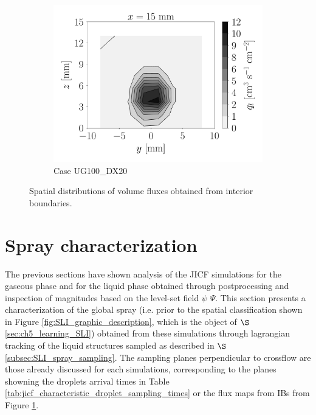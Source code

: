 \begin{figure}[ht]
\begin{subfigure}[b]{1.1\textwidth}
   \includegraphics[scale=0.225]{./part2_developments/figures_ch5_resolved_JICF/flow_rates_ibs/spatial_maps/UG100_DX20_x15mm_volume_flux}
   \vspace*{-0.1in}
	\caption{Case UG100\_DX20}
\end{subfigure}


   \caption{Spatial distributions of volume fluxes obtained from interior boundaries.}
\label{fig:ibs_spatial_distributions}
\end{figure}

\clearpage

\section{Spray characterization}
\label{sec:ch5_sec_spray_characterization}


The previous sections have shown analysis of the JICF simulations for the gaseous phase and for the liquid phase obtained through postprocessing and inspection of magnitudes based on the level-set field $\psi$ $\Psi$. This section presents a characterization of the global spray (i.e. prior to the spatial classification shown in Figure \ref{fig:SLI_graphic_description}, which is the object of $\S$\ref{sec:ch5_learning_SLI}) obtained from these simulations through lagrangian tracking of the liquid structures sampled as described in $\S$\ref{subsec:SLI_spray_sampling}. The sampling planes perpendicular to crossflow are those already discussed for each simulations, corresponding to the planes showning the droplets arrival times in Table \ref{tab:jicf_characteristic_droplet_sampling_times} or the flux maps from IBs from Figure \ref{fig:ibs_spatial_distributions}.

